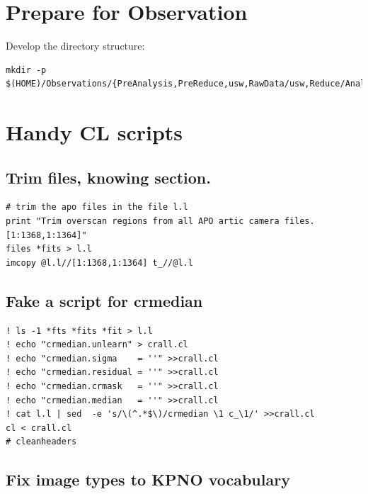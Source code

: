 \documentclass[letter,11pt,oneside]{article}
\begin{document}
\section{Prepare for Observation}

Develop the directory structure:


\begingroup \fontsize{10pt}{10pt}
\selectfont
\begin{verbatim} 
mkdir -p $(HOME)/Observations/{PreAnalysis,PreReduce,usw,RawData/usw,Reduce/Analysis}
\end{verbatim}
\endgroup

\section{Handy CL scripts}

\subsection{Trim files, knowing section.}

{\color{verbcolor}
\begin{verbatim}
# trim the apo files in the file l.l
print "Trim overscan regions from all APO artic camera files.  [1:1368,1:1364]"
files *fits > l.l
imcopy @l.l//[1:1368,1:1364] t_//@l.l
\end{verbatim}
}

\subsection{Fake a script for crmedian}

{\color{verbcolor}
\begin{verbatim}
! ls -1 *fts *fits *fit > l.l
! echo "crmedian.unlearn" > crall.cl
! echo "crmedian.sigma    = ''" >>crall.cl
! echo "crmedian.residual = ''" >>crall.cl
! echo "crmedian.crmask   = ''" >>crall.cl
! echo "crmedian.median   = ''" >>crall.cl
! cat l.l | sed  -e 's/\(^.*$\)/crmedian \1 c_\1/' >>crall.cl
cl < crall.cl
# cleanheaders
\end{verbatim}
}

\subsection{Fix image types to KPNO vocabulary}
\end{document}
